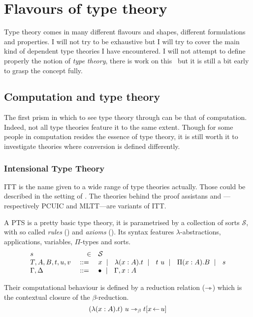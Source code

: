 \chapter{Flavours of type theory}

Type theory comes in many different flavours and shapes, different formulations
and properties. I will not try to be exhaustive but I will try to cover the
main kind of dependent type theories I have encountered.
I will not attempt to define properly the notion of \emph{type theory},
there is work on this~\misref{} but it is still a bit early to grasp the
concept fully.

\section{Computation and type theory}

The first prism in which to see type theory through can be that of computation.
Indeed, not all type theories feature it to the same extent. Though for some
people in computation resides the essence of type theory, it is still worth
it to investigate theories where conversion is defined differently.

\subsection{Intensional Type Theory}

\acrfull{ITT} is the name given to a wide range of type theories actually.
Those could be described in the setting of .
The theories behind the proof assistans \Coq and \Agda---respectively
\acrfull{PCUIC} and \acrfull{MLTT}---are variants of \acrshort{ITT}.

A \acrshort{PTS} is a pretty basic type theory, it is parametrised by a
collection of sorts \(\mathcal{S}\), with so called \emph{rules}
(\Rl) and \emph{axioms} (\Ax).
Its syntax features \(\lambda\)-abstractions, applications, variables,
\(\Pi\)-types and sorts.
%
\[
  \begin{array}{lrl}
    s &\in& \mathcal{S} \\
    T,A,B,t,u,v &\ \mathrel{{:}{:}{=}}\ & x \ \mid\ \  \lambda (x:A). t \ \mid\ \  t\ u
    \ \mid\ \  \Pi (x : A). B \ \mid\ \  s \\
    \Gamma, \Delta &\ \mathrel{{:}{:}{=}}\ & \bullet \ \mid\ \  \Gamma, x:A
  \end{array}
\]

Their computational behaviour is defined by a reduction relation (\(\rightarrowtriangle\))
which is the contextual closure of the \(\beta\)-reduction.
\[
  (\lambda (x:A). t)\ u \rightarrowtriangle_\beta t[x \mathop{\leftarrow} u]
\]


